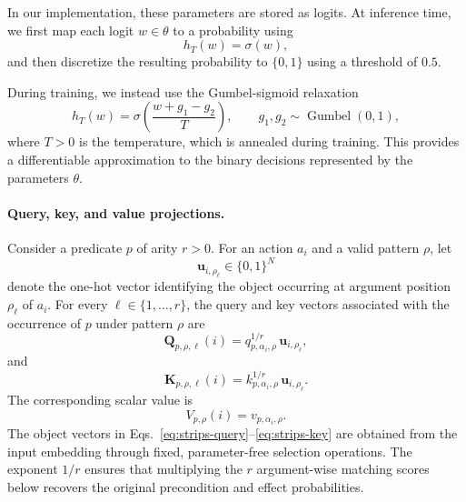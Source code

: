 In our implementation, these parameters are stored as logits.
At inference time, we first map each logit $w \in \theta$ to a probability using
\begin{equation}
h_T(w) = \sigma(w),
\label{eq:param-disc}
\end{equation}
and then discretize the resulting probability to $\{0,1\}$ using a threshold of $0.5$.

During training, we instead use the Gumbel-sigmoid relaxation \citep{jang2017categorical}
\begin{equation}
h_T(w)
=
\sigma\!\left(
\frac{w+g_1-g_2}{T}
\right),
\qquad
g_1,g_2 \sim \operatorname{Gumbel}(0,1),
\label{eq:strips-gumbel}
\end{equation}
where $T>0$ is the temperature, which is annealed during training.
This provides a differentiable approximation to the binary decisions represented by the \strips parameters $\theta$.



\iffalse
\paragraph{Query, key, and value projections.}
Consider a predicate $p$ of arity $r>0$.
For an action $a_i$ and a valid pattern $\rho$, let
\begin{equation}
\mathbf{u}_{i,\rho_\ell} \in \{0,1\}^{N}
\end{equation}
denote the one-hot vector identifying the object occurring at argument position $\rho_\ell$ of $a_i$.
For every $\ell\in\{1,\ldots,r\}$, the query and key vectors associated with the occurrence of $p$ under pattern $\rho$ are
\begin{equation}
\mathbf{Q}_{p,\rho,\ell}(i)
=
q_{p,\alpha_i,\rho}^{1/r}
\,\mathbf{u}_{i,\rho_\ell},
\label{eq:strips-query}
\end{equation}
and
\begin{equation}
\mathbf{K}_{p,\rho,\ell}(i)
=
k_{p,\alpha_i,\rho}^{1/r}
\,\mathbf{u}_{i,\rho_\ell}.
\label{eq:strips-key}
\end{equation}
The corresponding scalar value is
\begin{equation}
V_{p,\rho}(i)
=
v_{p,\alpha_i,\rho}.
\label{eq:strips-value}
\end{equation}
The object vectors in Eqs.~\ref{eq:strips-query}--\ref{eq:strips-key} are obtained from the input embedding through fixed, parameter-free selection operations.
The exponent $1/r$ ensures that multiplying the $r$ argument-wise matching scores below recovers the original precondition and effect probabilities.

